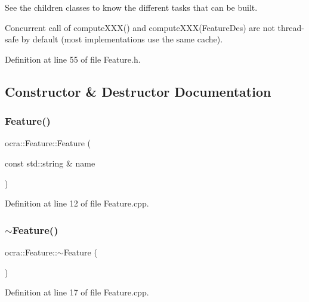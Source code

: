 See the children classes to know the different tasks that can be built.

Concurrent call of compute\+X\+X\+X() and compute\+X\+X\+X(\+Feature\+Des) are not thread-\/safe by default (most implementations use the same cache). 

Definition at line 55 of file Feature.\+h.



\subsection{Constructor \& Destructor Documentation}
\hypertarget{classocra_1_1Feature_ad0c940337cd0716bd8f45b63b03dd704}{}\label{classocra_1_1Feature_ad0c940337cd0716bd8f45b63b03dd704} 
\subsubsection{\texorpdfstring{Feature()}{Feature()}}
{\footnotesize\ttfamily ocra\+::\+Feature\+::\+Feature (\begin{DoxyParamCaption}\item[{const std\+::string \&}]{name }\end{DoxyParamCaption})\hspace{0.3cm}{\ttfamily [protected]}}



Definition at line 12 of file Feature.\+cpp.

\hypertarget{classocra_1_1Feature_ac586ef442048720b70662fed9bdf3e82}{}\label{classocra_1_1Feature_ac586ef442048720b70662fed9bdf3e82} 
\subsubsection{\texorpdfstring{$\sim$\+Feature()}{~Feature()}}
{\footnotesize\ttfamily ocra\+::\+Feature\+::$\sim$\+Feature (\begin{DoxyParamCaption}{ }\end{DoxyParamCaption})\hspace{0.3cm}{\ttfamily [pure virtual]}}



Definition at line 17 of file Feature.\+cpp.



